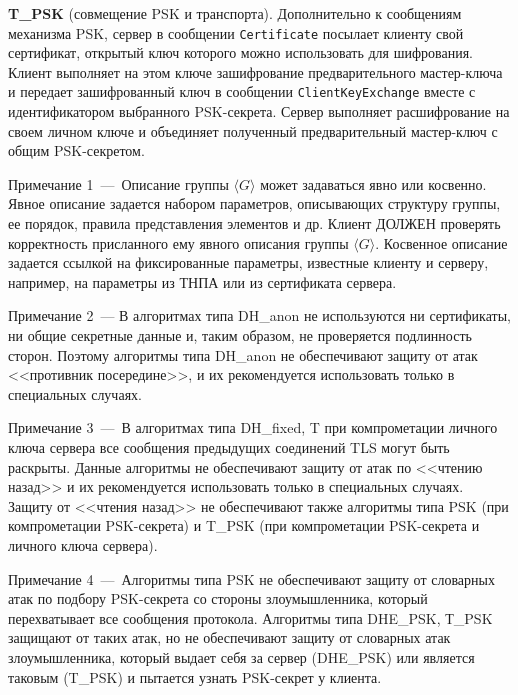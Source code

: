 {\bf T\_PSK} (совмещение PSK и транспорта). Дополнительно к сообщениям 
механизма PSK, сервер в сообщении \lstinline{Certificate} посылает клиенту 
свой сертификат, открытый ключ которого можно использовать для 
шифрования. Клиент выполняет на этом ключе зашифрование предварительного 
мастер-ключа и передает зашифрованный ключ в сообщении 
\lstinline{ClientKeyExchange} вместе с идентификатором выбранного 
PSK-секрета. Сервер выполняет расшифрование на своем личном ключе и 
объединяет полученный предварительный мастер-ключ с общим PSK-секретом. 

\begin{note}
Примечание 1~---~Описание группы $\langle G \rangle$ может 
задаваться явно или косвенно. Явное описание задается набором параметров, 
описывающих структуру группы, ее порядок, правила представления элементов 
и др. Клиент ДОЛЖЕН проверять
корректность присланного ему явного описания группы $\langle G \rangle$. 
Косвенное описание задается ссылкой на фиксированные параметры, известные 
клиенту и серверу, например, на параметры из ТНПА или из сертификата 
сервера.
\end{note}

\begin{note}
Примечание 2~--- В алгоритмах типа DH\_anon не используются ни 
сертификаты, ни общие секретные данные и, таким образом, не проверяется 
подлинность сторон. Поэтому алгоритмы типа DH\_anon не обеспечивают защиту 
от атак <<противник посередине>>, и их рекомендуется использовать только в 
специальных случаях.
\end{note}

\begin{note}
Примечание 3~---~В алгоритмах типа DH\_fixed, T при компрометации 
личного ключа сервера все сообщения предыдущих соединений TLS могут быть 
раскрыты. Данные алгоритмы не обеспечивают защиту от атак по <<чтению 
назад>> и их рекомендуется использовать только в специальных случаях. 
Защиту от <<чтения назад>> не обеспечивают также алгоритмы типа PSK (при 
компрометации PSK-секрета) и T\_PSK (при компрометации PSK-секрета и 
личного ключа сервера).
\end{note}
 
\begin{note}
Примечание 4~---~Алгоритмы типа PSK не обеспечивают защиту от 
словарных атак по подбору PSK-секрета со стороны злоумышленника, который 
перехватывает все сообщения протокола. Алгоритмы типа DHE\_PSK, Т\_PSK 
защищают от таких атак, но не обеспечивают защиту от словарных атак 
злоумышленника, который выдает себя за сервер (DHE\_PSK) или является 
таковым (T\_PSK) и пытается узнать PSK-секрет у клиента.
\end{note}

